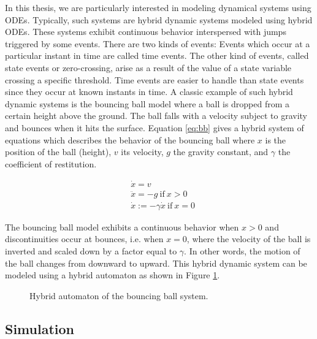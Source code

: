 In this thesis, we are particularly interested in modeling dynamical systems using ODEs. Typically, such systems are hybrid dynamic systems modeled using hybrid ODEs. These systems exhibit continuous behavior interspersed with jumps triggered by some events. There are two kinds of events: Events which occur at a particular instant in time are called time events. The other kind of events, called state events or zero-crossing, arise as a result of the value of a state variable crossing a specific threshold. Time events are easier to handle than state events since they occur at known instants in time. A classic example of such hybrid dynamic systems is the bouncing ball model where a ball is dropped from a certain height above the ground. The ball falls with a velocity subject to gravity and bounces when it hits the surface. Equation \ref{eq:bb} gives a hybrid system of equations which describes the behavior of the bouncing ball where $x$ is the position of the ball (height), $v$ its velocity, $g$ the gravity constant, and $\gamma$ the coefficient of restitution.

\begin{equation}
\begin{aligned}
&\dot{x} = v\\
&\ddot{x} = -g\ \text{if}\ x > 0\\
&\dot{x} := -\gamma \dot{x}\ \text{if}\ x = 0 
\end{aligned}
\label{eq:bb}
\end{equation}  

The bouncing ball model exhibits a continuous behavior when $x > 0$ and discontinuities occur at bounces, i.e. when $x = 0$, where the velocity of the ball is inverted and scaled down by a factor equal to $\gamma$. In other words, the motion of the ball changes from downward to upward. This hybrid dynamic system can be modeled using a hybrid automaton as shown in Figure \ref{fig:bbautomaton}.

\begin{figure}[phbt]
\centering

\caption{Hybrid automaton of the bouncing ball system.}
\label{fig:bbautomaton}
\end{figure}

\subsection{Simulation}

